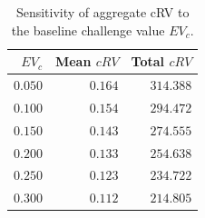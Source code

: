 \begin{table}[h]
\centering
\caption{Sensitivity of aggregate cRV to the baseline challenge value $EV_c$.}
\label{tab:evsens}
\small
\begin{tabular}{rrr}
\toprule
$EV_c$ & Mean $cRV$ & Total $cRV$ \\
\midrule
$0.050$ & $0.164$ & $314.388$ \\
$0.100$ & $0.154$ & $294.472$ \\
$0.150$ & $0.143$ & $274.555$ \\
$0.200$ & $0.133$ & $254.638$ \\
$0.250$ & $0.123$ & $234.722$ \\
$0.300$ & $0.112$ & $214.805$ \\
\bottomrule
\end{tabular}
\end{table}
